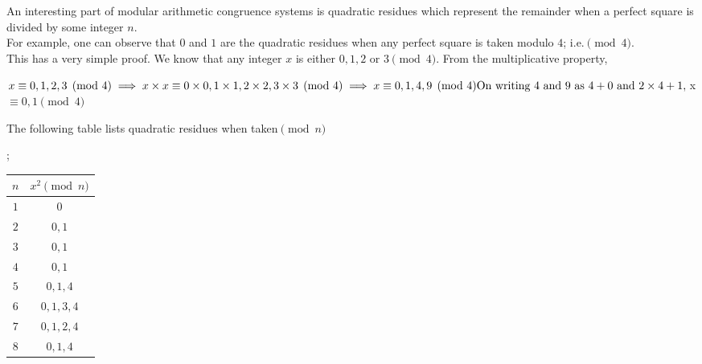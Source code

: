 \begin{mathbox}{}
{An interesting part of modular arithmetic congruence systems is quadratic residues which represent the remainder when a perfect square is divided by some integer $n$. \\
For example, one can observe that $0$ and $1$ are the quadratic residues when any perfect square is taken modulo $4$; i.e.$\pmod 4$.\\
This has a very simple proof. We know that any integer $x$ is either $0, 1, 2$ or $3 \pmod 4$. From the multiplicative property,
\begin{center}
    $x \equiv 0, 1, 2, 3 \pmod 4\\
    \implies x \times x \equiv 0 \times 0, 1 \times 1, 2 \times 2, 3 \times 3 \pmod 4\\
    \implies x \equiv 0, 1, 4, 9 \pmod 4\\
    \text{On writing $4$ and $9$ as $4 + 0$ and $2\times 4 + 1$},\\
    $x$ \equiv 0, 1 \pmod 4$
\end{center}
The following table lists quadratic residues when taken$\pmod n$};
\begin{center}
\begin{tabular}{ |c|c| } 
    \hline
    $n$ & $x^2 \pmod n$\\
    \hline
    $1$ & $0$\\
    $2$ & $0, 1$\\
    $3$ & $0, 1$\\
    $4$ & $0, 1$\\
    $5$ & $0, 1, 4$\\
    $6$ & $0, 1, 3, 4$\\
    $7$ & $0, 1, 2, 4$\\
    $8$ & $0, 1, 4$\\
    \hline
\end{tabular}
\end{center}
\end{mathbox}
